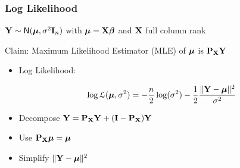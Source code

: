 \documentclass[handout]{beamer}
\begin{document}
\begin{frame}
  \frametitle{Log Likelihood}
     $\mathbf{Y} \sim \textsf{N}(\boldsymbol{\mu}, \sigma^2 \mathbf{I}_n)$ with
    $\boldsymbol{\mu} = \mathbf{X} \boldsymbol{\beta}$  and $\mathbf{X}$ full column rank \\ \pause

 Claim: Maximum Likelihood Estimator (MLE) of $\boldsymbol{\mu}$ is
    $\mathbf{P}_{\mathbf{X}} \mathbf{Y}$  \pause

  \begin{itemize}
\item Log Likelihood:  \pause

$$ \log {\cal{L}}(\boldsymbol{\mu}, \sigma^2) =
-\frac{n}{2} \log(\sigma^2)
  - \frac 1 2 \frac{\| \mathbf{Y} - \boldsymbol{\mu} \|^2}{\sigma^2}
$$  \pause
\item Decompose $\mathbf{Y} = \mathbf{P}_{\mathbf{X}} \mathbf{Y} + (\mathbf{I} - \mathbf{P}_{\mathbf{X}}) \mathbf{Y}$  \pause
\item Use $\mathbf{P}_{\mathbf{X}} \boldsymbol{\mu} = \boldsymbol{\mu}$  \pause
\item Simplify $\| \mathbf{Y} - \boldsymbol{\mu} \|^2$
  \end{itemize}

\end{frame}
\end{document}

